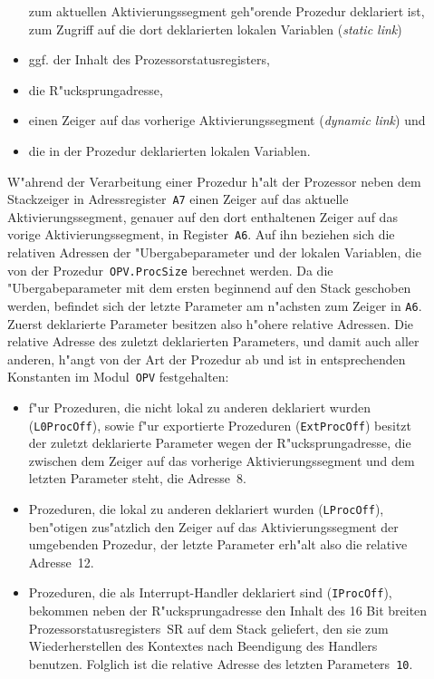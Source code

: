 \begin{description}
\begin{itemize}
    zum aktuellen Aktivierungssegment geh"orende Prozedur deklariert ist, zum
    Zugriff auf die dort deklarierten lokalen Variablen ({\it static link\/})
  \item ggf. der Inhalt des Prozessorstatusregisters,
  \item die R"ucksprungadresse,
  \item einen Zeiger auf das vorherige Aktivierungssegment ({\it dynamic link\/}) und
  \item die in der Prozedur deklarierten lokalen Variablen.
  \end{itemize}
  W"ahrend der Verarbeitung einer Prozedur h"alt der Prozessor neben dem
  Stackzeiger in Adress\-register~{\tt A7} einen Zeiger auf das aktuelle
  Aktivierungssegment, genauer auf den dort enthaltenen Zeiger auf das
  vorige Aktivierungssegment, in Register~{\tt A6}.
  Auf ihn beziehen sich die relativen Adressen der "Ubergabeparameter und der
  lokalen Variablen, die von der Prozedur~{\tt OPV.ProcSize} berechnet werden.
  Da die "Ubergabeparameter mit dem ersten beginnend auf den Stack geschoben
  werden, befindet sich der letzte Parameter am n"achsten zum Zeiger in {\tt A6}.
  Zuerst deklarierte Parameter besitzen also h"ohere relative Adressen.
  Die relative Adresse des zuletzt deklarierten Parameters, und damit auch aller
  anderen, h"angt von der Art der Prozedur ab und ist in entsprechenden
  Konstanten im Modul~{\tt OPV} festgehalten:
  \begin{itemize}
  \item f"ur Prozeduren, die nicht lokal zu anderen deklariert wurden ({\tt L0ProcOff}),
    sowie f"ur exportierte Prozeduren ({\tt ExtProcOff}) besitzt der zuletzt
    deklarierte Parameter wegen der R"ucksprungadresse, die zwischen dem
    Zeiger auf das vorherige Aktivierungssegment und dem letzten Parameter
    steht, die Adresse~8.
  \item Prozeduren, die lokal zu anderen deklariert wurden ({\tt LProcOff}),
    ben"otigen zus"atzlich den Zeiger auf das Aktivierungssegment der
    umgebenden Prozedur, der letzte Parameter erh"alt also die relative
    Adresse~12.
  \item Prozeduren, die als Interrupt-Handler deklariert sind ({\tt IProcOff}),
    bekommen neben der R"ucksprungadresse den Inhalt des 16 Bit breiten
    Prozessorstatusregisters~SR auf dem Stack geliefert, den sie zum
    Wiederherstellen des Kontextes nach Beendigung des Handlers benutzen.
    Folglich ist die relative Adresse des letzten Parameters~{\tt 10}.
  \end{itemize}


\end{description}
